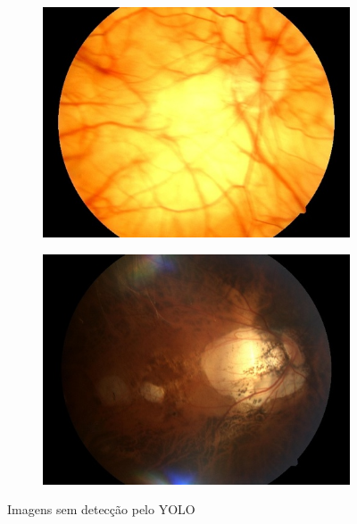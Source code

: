 \documentclass[12pt]{article}
\begin{document}
\begin{figure}
    \break
    \begin{subfigure}[b]{0.47\textwidth}
        \centering
        \includegraphics[width=\textwidth]{images/no_box/TRAIN046833_boxes.jpg}
        \label{fig:images_no_box_3}
    \end{subfigure}
    \hfill
    \begin{subfigure}[b]{0.47\textwidth}
        \centering
        \includegraphics[width=\textwidth]{images/no_box/TRAIN099284_boxes.jpg}
        \label{fig:images_no_box_4}
    \end{subfigure}
    \caption{Imagens sem detecção pelo YOLO}
    \label{fig:images_no_box}
\end{figure}
\end{document}
